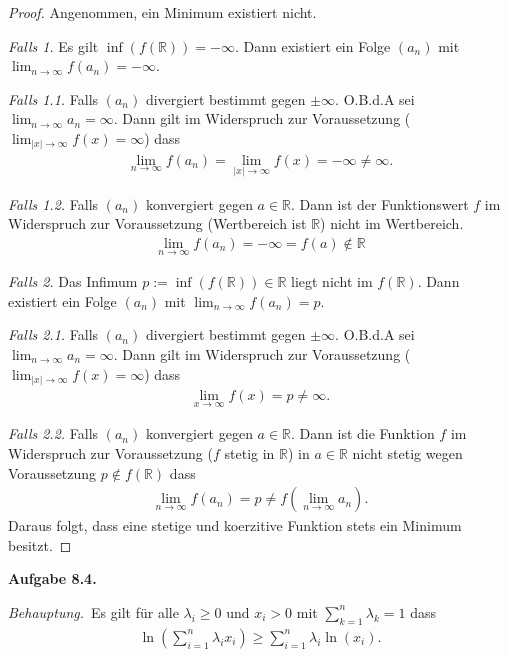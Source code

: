 \documentclass[12pt]{extarticle}
\newcommand{\beh}{\textit{Behauptung.}\ }
\newcommand{\aufgn}[1]{\textbf{Aufgabe #1.}}
\newcommand{\mg}[1]{\mathbb{#1}}
\begin{document}
\begin{proof}
  Angenommen, ein Minimum existiert nicht.

  \textit{Falls 1.} Es gilt
  \(\inf (f(\mg{R})) = -\infty\). Dann existiert ein
  Folge \((a_n)\) mit
  \(\lim_{n \to \infty}f(a_n) = - \infty\).

  \textit{Falls 1.1.}  Falls \((a_n)\) divergiert
  bestimmt gegen \(\pm \infty\).  O.B.d.A sei
  \(\lim_{n \to \infty}{a_n} = \infty\).  Dann gilt im
  Widerspruch zur Voraussetzung
  (\(\lim_{\left| x \right| \to \infty}{f(x)} = \infty\))
  dass
\begin{align*}
  \lim_{n \to \infty}{f(a_n)}
  = \lim_{\left| x \right|  \to \infty}{f(x)}
  = - \infty \ne \infty.
\end{align*}

\textit{Falls 1.2.}  Falls \((a_n)\) konvergiert gegen
\(a \in \mg{R}\).  Dann ist der Funktionswert \(f\) im
Widerspruch zur Voraussetzung (Wertbereich ist
\(\mg{R}\)) nicht im Wertbereich.
\begin{align*}
  \lim_{n \to \infty}{f(a_n)}
  = - \infty = f(a) \notin \mg{R}
\end{align*}

\textit{Falls 2.} Das Infimum
\(p := \inf (f(\mg{R})) \in \mg{R}\) liegt nicht im
\(f(\mg{R})\).  Dann existiert ein Folge \((a_n)\) mit
\(\lim_{n \to \infty}f(a_n) = p\).

  \textit{Falls 2.1.}  Falls \((a_n)\) divergiert
  bestimmt gegen \(\pm \infty\).  O.B.d.A sei
  \(\lim_{n \to \infty}{a_n} = \infty\).  Dann gilt im
  Widerspruch zur Voraussetzung
  (\(\lim_{\left| x \right| \to \infty}{f(x)} = \infty\))
  dass
\begin{align*}
\lim_{x \to \infty}{f(x)} = p \ne \infty.
\end{align*}

\textit{Falls 2.2.}  Falls \((a_n)\) konvergiert gegen
\(a \in \mg{R}\).  Dann ist die Funktion \(f\) im
Widerspruch zur Voraussetzung (\(f\) stetig in \(\mg{R}\))
in \(a \in \mg{R}\) nicht stetig wegen Voraussetzung $p
\notin f(\mg{R})$ dass
\begin{align*}
  \lim_{n \to \infty}{f(a_n)} = p
  \ne f \left( \lim_{n  \to \infty}{a_n} \right).
\end{align*}
Daraus folgt, dass eine stetige und koerzitive Funktion
stets ein Minimum besitzt.
\end{proof}
\aufgn{8.4}

\beh Es gilt für alle \(\lambda_i \ge 0\) und \(x_i > 0\)
mit \(\sum_{k=1}^n{\lambda_k} = 1\) dass
\begin{align*}
  \ln \left( \sum_{i=1}^n{\lambda_ix_i} \right) \ge
  \sum_{i=1}^n{\lambda_i\ln(x_i)}.
\end{align*}
\end{document}
